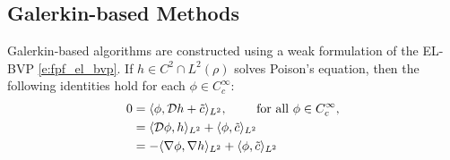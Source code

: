 \subsection{Galerkin-based Methods} 
\label{s:galerkin}
Galerkin-based algorithms are constructed using a weak formulation of the EL-BVP \eqref{e:fpf_el_bvp}.  If $h\in C^2\cap L^2(\rho)$ solves Poison's equation,  then the following identities hold for each $\phi \in C^\infty_c$:
\begin{equation}
\begin{aligned}
0 & = \langle \phi, \generate h + \tilc \rangle_{L^2}, \qquad \text{ for all } \phi \in C_c^\infty, \\
& = \langle \generate \phi, h \rangle_{L^2} + \langle \phi, \tilc \rangle_{L^2} \\ 
& = - \langle \nabla \phi, \nabla h \rangle_{L^2} + \langle \phi, \tilc \rangle_{L^2}
\end{aligned}
\label{e:fpf_galerkin}
\end{equation}


